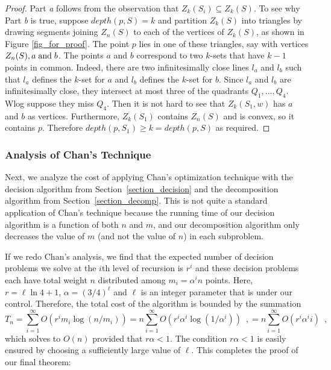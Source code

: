 \documentclass[charterfonts,lotsofwhite]{patmorin}
\begin{document}
\begin{proof} Part \textit{a} follows from the observation that
$Z_k(S_i) \subseteq Z_k(S)$. To see why Part \textit{b} is true,
suppose $depth(p,S) = k$ and partition $Z_k(S)$ into triangles by
drawing segments joining $Z_n(S)$ to each of the vertices of $Z_k(S)$,
as shown in Figure \ref{fig_for_proof}. The point $p$ lies in one of
these triangles, say with vertices $Z_n(S), a \hspace{1mm} \mbox{and}
\hspace{1mm} b$. The points $a$ and $b$ correspond to two $k$-sets
that have $k-1$ points in common. Indeed, there are two
infinitesimally close lines $l_a$ and $l_b$ such that $l_a$ defines
the $k$-set for $a$ and $l_b$ defines the $k$-set for $b$. Since $l_a$
and $l_b$ are infinitesimally close, they intersect at most three of
the quadrants $Q_1, \ldots, Q_4$. Wlog suppose they miss $Q_4$. Then
it is not hard to see that $Z_k(S_1,w)$ has $a$ and $b$ as vertices.
Furthermore, $Z_k(S_1)$ contains $Z_n(S)$ and is convex, so it
contains $p$. Therefore $depth(p,S_1) \ge k = depth(p,S)$ as required.
\end{proof}

\subsubsection{Analysis of Chan's Technique}

Next, we analyze the cost of applying Chan's optimization technique
with the decision algorithm from Section~\ref{section_decision} and
the decomposition algorithm from Section~\ref{section_decomp}.  This
is not quite a standard application of Chan's technique because the
running time of our decision algorithm is a function of both $n$ and
$m$, and our decomposition algorithm only decreases the value of $m$
(and not the value of $n$) in each subproblem. 

If we redo Chan's analysis, we find that the expected number of
decision problems we solve at the $i$th level of recursion is $r^i$
and these decision problems each have total weight $n$ distributed
among $m_i=\alpha^i n$ points.  Here, $r=\ell\ln4+1$,
$\alpha=(3/4)^\ell$ and $\ell$ is an integer parameter that is under
our control.  Therefore, the total cost of the algorithm is bounded by
the summation
\[
   T_n = \sum_{i=1}^\infty O\left(r^im_i\log (n/m_i)\right)
   = n\sum_{i=1}^\infty O\left(r^i\alpha^i \log(1/\alpha^i)\right) \enspace ,
   = n\sum_{i=1}^\infty O\left(r^i\alpha^i i\right) \enspace ,
\]
which solves to $O(n)$ provided that $r\alpha < 1$.  The condition
$r\alpha < 1$ is easily ensured by choosing a sufficiently large
value of $\ell$.  This completes the proof of our final theorem:
\end{document}
